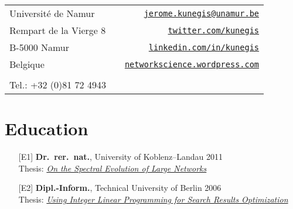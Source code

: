 \documentclass[line,mm]{res}
\newcounter{x}
\newcounter{y}
\begin{document}
\begin{resume}

\vspace{0.5cm}

\hspace{+0.53cm}
\begin{tabular}{lcr}
  Université de Namur    &\hspace{2.7cm}\hfill& {\tt \href{mailto:jerome.kunegis@unamur.be}{jerome.kunegis@unamur.be}} \\
  Rempart de la Vierge 8 &                    & {\tt \href{http://twitter.com/kunegis}{twitter.com/kunegis}} \\
  B-5000 Namur           &                    & {\tt \href{http://www.linkedin.com/in/kunegis}{linkedin.com/in/kunegis}} \\
  Belgique               &                    & {\tt \href{http://networkscience.wordpress.com/}{networkscience.wordpress.com}} \\
  & & \\
  Tel.:  +32 (0)81 72 4943
\end{tabular}
\vspace{0.5cm}

\section{Education}

\begin{itemize}

\item[{[E1]}]
\textbf{Dr.\ rer.\ nat.}, University of Koblenz--Landau \hfill 2011 \\
Thesis: \emph{\href{https://kola.opus.hbz-nrw.de/frontdoor/index/index/docId/581}{On
       the Spectral Evolution of Large Networks}}

\item[{[E2]}]
\textbf{Dipl.-Inform.}, Technical University of Berlin \hfill 2006 \\
Thesis: \emph{\href{https://pdfs.semanticscholar.org/42ca/e9b00864ee09bc9bc92ef3d411e20b966a8d.pdf}{Using Integer Linear Programming for Search Results Optimization}}


\end{itemize}
\end{resume}
\end{document}
